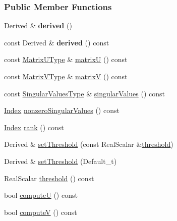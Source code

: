 \subsubsection*{Public Member Functions}
\begin{DoxyCompactItemize}
\item 
\mbox{\label{group___s_v_d___module_ab6cdcd4fb99772cf36e7fe2dac0bd847}} 
Derived \& {\bfseries derived} ()
\item 
\mbox{\label{group___s_v_d___module_ae888cfb7f9faf8bbd12ee943c8cbf2b2}} 
const Derived \& {\bfseries derived} () const
\item 
const \hyperlink{group___core___module}{Matrix\+U\+Type} \& \hyperlink{group___s_v_d___module_afc7fe1546b0f6e1801b86f22f5664cb8}{matrixU} () const
\item 
const \hyperlink{group___core___module}{Matrix\+V\+Type} \& \hyperlink{group___s_v_d___module_a245a453b5e7347f737295c23133238c4}{matrixV} () const
\item 
const \hyperlink{class_eigen_1_1internal_1_1_tensor_lazy_evaluator_writable}{Singular\+Values\+Type} \& \hyperlink{group___s_v_d___module_a4e7bac123570c348f7ed6be909e1e474}{singular\+Values} () const
\item 
\hyperlink{group___s_v_d___module_a6229a37997eca1072b52cca5ee7a2bec}{Index} \hyperlink{group___s_v_d___module_afe8a555f38393a319a71ec0f0331c9ef}{nonzero\+Singular\+Values} () const
\item 
\hyperlink{group___s_v_d___module_a6229a37997eca1072b52cca5ee7a2bec}{Index} \hyperlink{group___s_v_d___module_a30b89e24f42f1692079eea31b361d26a}{rank} () const
\item 
Derived \& \hyperlink{group___s_v_d___module_a1c95d05398fc15e410a28560ef70a5a6}{set\+Threshold} (const Real\+Scalar \&\hyperlink{group___s_v_d___module_a98b2ee98690358951807353812a05c69}{threshold})
\item 
Derived \& \hyperlink{group___s_v_d___module_a27586b69dbfb63f714d1d45fd6304f97}{set\+Threshold} (Default\+\_\+t)
\item 
Real\+Scalar \hyperlink{group___s_v_d___module_a98b2ee98690358951807353812a05c69}{threshold} () const
\item 
bool \hyperlink{group___s_v_d___module_a705a7c2709e1624ccc19aa748a78d473}{computeU} () const
\item 
bool \hyperlink{group___s_v_d___module_a5f12efcb791eb007d4a4890ac5255ac4}{computeV} () const

\end{DoxyCompactItemize}
